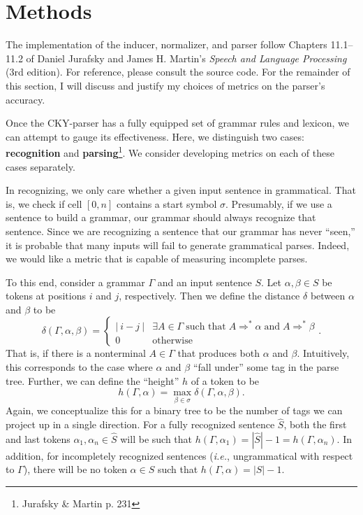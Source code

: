 \documentclass[paper=a4, fontsize=11pt]{scrartcl} %
\begin{document}
\section*{Methods}

The implementation of the inducer, normalizer, and parser follow Chapters 11.1--11.2 of Daniel Jurafsky and James H. Martin's \textit{Speech and Language Processing} (3rd edition).  For reference, please consult the source code.  For the remainder of this section, I will discuss and justify my choices of metrics on the parser's accuracy.

Once the CKY-parser has a fully equipped set of grammar rules and lexicon, we can attempt to gauge its effectiveness.  Here, we distinguish two cases: \textbf{recognition} and \textbf{parsing}\footnote{Jurafsky \& Martin p. 231}.  We consider developing metrics on each of these cases separately.

In recognizing, we only care whether a given input sentence in grammatical.  That is, we check if cell $[0,n]$ contains a start symbol $\sigma$.  Presumably, if we use a sentence to build a grammar, our grammar should always recognize that sentence.  Since we are recognizing a sentence that our grammar has never ``seen,'' it is probable that many inputs will fail to generate grammatical parses.  Indeed, we would like a metric that is capable of measuring incomplete parses.

To this end, consider a grammar $\Gamma$ and an input sentence $S$.  Let $\alpha, \beta \in S$ be tokens at positions $i$ and $j$, respectively.  Then we define the distance $\delta$ between $\alpha$ and $\beta$ to be $$ \delta(\Gamma, \alpha, \beta) = \begin{cases}
    |\ i-j\ | & \exists A \in \Gamma \;\mbox{such that}\; A \Rightarrow^* \alpha \;\mbox{and}\; A \Rightarrow^* \beta \\
    0 & \mbox{otherwise}
\end{cases}.$$  That is, if there is a nonterminal $A \in \Gamma$ that produces both $\alpha$ and $\beta$.  Intuitively, this corresponds to the case where $\alpha$ and $\beta$ ``fall under'' some tag in the parse tree.  Further, we can define the ``height'' $h$ of a token to be $$ h(\Gamma,\alpha) = \max_{\beta \in \sigma} \delta(\Gamma, \alpha,\beta). $$  Again, we conceptualize this for a binary tree to be the number of tags we can project up in a single direction.  For a fully recognized sentence $\hat{S}$, both the first and last tokens $\alpha_1, \alpha_n \in \hat{S}$ will be such that $h(\Gamma,\alpha_1) = |\hat{S}| - 1 = h(\Gamma,\alpha_n)$.  In addition, for incompletely recognized sentences (\textit{i.e.}, ungrammatical with respect to $\Gamma$), there will be no token $\alpha \in S$ such that $h(\Gamma,\alpha) = |S| - 1$.
\end{document}
